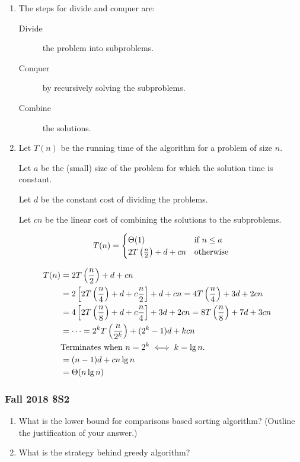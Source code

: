 \begin{enumerate}[label=\alph*.]
\item The steps for divide and conquer are:

\begin{description}
	\item [Divide] the problem into subproblems.
	\item [Conquer] by recursively solving the subproblems. 
	\item [Combine] the solutions.  
\end{description}

\item
Let $T(n)$ be the running time of the algorithm for a problem of size $n$.  

Let $a$ be the (small) size of the problem for which the solution time is constant.  

Let $d$ be the constant cost of dividing the problems.  

Let $cn$ be the linear cost of combining the solutions to the subproblems.  

$$T(n) = 
\begin{cases}
	\Theta(1) & \text{if } n \le a \cr
	2 T \left( \frac{n}{2} \right) + d + cn & \text{otherwise} \cr
\end{cases}
$$

\begin{align*}
	T(n) &= 2 T \left( \frac{n}{2} \right) + d + cn\cr
	&= 2 \left[ 2T\left( \frac{n}{4} \right) + d + c\frac{n}{2} \right] + d + cn = 4T\left( \frac{n}{4} \right) + 3d + 2cn \cr
	&= 4 \left[ 2T\left( \frac{n}{8} \right) + d + c \frac{n}{4} \right] + 3d + 2cn = 8T\left( \frac{n}{8} \right) + 7d + 3cn  \cr
	&= \cdots = 2^k T \left( \frac{n}{2^k} \right) + (2^k-1)d + kcn \cr
	& \text{Terminates when } n = 2^k \iff k = \lg n. \cr
	&= (n-1)d + c n\lg n \cr
	&= \Theta(n \lg n) \cr
\end{align*}

\end{enumerate}

\subsubsection{Fall 2018 \$S2}	
	\begin{enumerate}[label=\alph*.]
		\item What is the lower bound for comparisons based sorting algorithm? (Outline the justification of your answer.)
		\item What is the strategy behind greedy algorithm?
	\end{enumerate}
	
